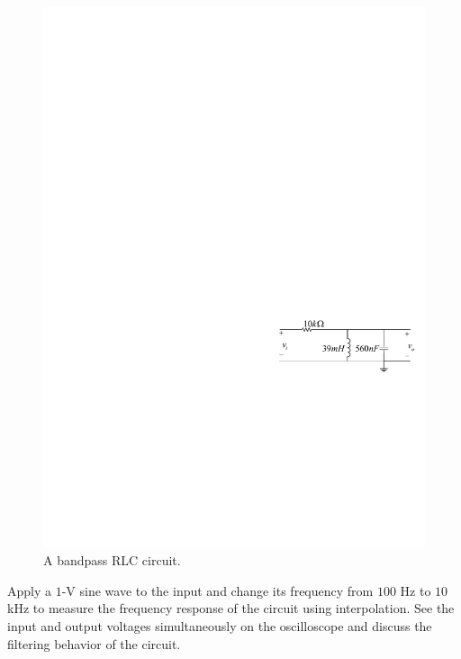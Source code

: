 \documentclass[11pt]{article}
\begin{document}

\begin{question}


\begin{figure}[H]
\centering
\includegraphics[scale=1.2,angle=0]{Fig/cir4.pdf}
\caption{A bandpass RLC circuit.} \label{fig:cir4}
\end{figure}

\begin{subquestion}{Apply a $1$-V sine wave to the input and change its frequency from $100$ Hz to $10$ kHz to measure the frequency response of the circuit using interpolation. See the input and output voltages simultaneously on the oscilloscope and discuss the filtering behavior of the circuit.} 
\answer{}
\end{subquestion}


\end{question}
\end{document}
